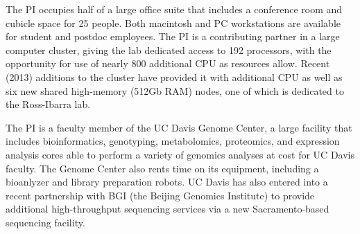 The PI occupies half of a large office suite that includes a conference room and cubicle space for 25 people.  Both macintosh and PC workstations are available for student and postdoc employees. The PI is a contributing partner in a large computer cluster, giving the lab dedicated access to 192 processors, with the opportunity for use of nearly 800 additional CPU as resources allow. Recent (2013) additions to the cluster have provided it with additional CPU as well as six new shared high-memory (512Gb RAM) nodes, one of which is dedicated to the Ross-Ibarra lab.

The PI is a faculty member of the UC Davis Genome Center, a large facility that includes bioinformatics, genotyping, metabolomics, proteomics, and expression analysis cores able to perform a variety of genomics analyses at cost for UC Davis faculty. The Genome Center also rents time on its equipment, including a bioanlyzer and library preparation robots. UC Davis has also entered into a recent partnership with BGI (the Beijing Genomics Institute) to provide additional high-throughput sequencing services via a new Sacramento-based sequencing facility.



